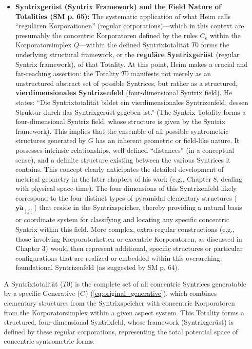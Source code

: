 \documentclass[12pt]{article}
\newcommand{\q}[1]{\enquote{#1}}
\newcommand{\elementarstruktur}{\bm{y\widetilde{a}}_{(j)}}
\newcommand{\syntrixtotalitaet}{T0}
\newcommand{\generative}{G}
\begin{document}
\begin{itemize}
    \item \textbf{Syntrixgerüst (Syntrix Framework) and the Field Nature of Totalities (SM p. 65):}
    The systematic application of what Heim calls \q{regulären Korporationen} (regular corporations)—which in this context are presumably the concentric Korporatoren defined by the rules \(C_k\) within the Korporatorsimplex \( Q \)—within the defined Syntrixtotalität \( \syntrixtotalitaet \) forms the underlying structural framework, or the \textbf{reguläre Syntrixgerüst} (regular Syntrix framework), of that Totality. At this point, Heim makes a crucial and far-reaching assertion: the Totality \( \syntrixtotalitaet \) manifests not merely as an unstructured abstract set of possible Syntrices, but rather as a structured, \textbf{vierdimensionales Syntrizenfeld} (four-dimensional Syntrix field). He states: \q{Die Syntrixtotalität bildet ein vierdimensionales Syntrizenfeld, dessen Struktur durch das Syntrixgerüst gegeben ist.} (The Syntrix Totality forms a four-dimensional Syntrix field, whose structure is given by the Syntrix framework). This implies that the ensemble of all possible syntrometric structures generated by \( \generative \) has an inherent geometric or field-like nature. It possesses intrinsic relationships, well-defined \q{distances} (in a conceptual sense), and a definite structure existing between the various Syntrices it contains. This concept clearly anticipates the detailed development of metrical geometry in the later chapters of his work (e.g., Chapter 8, dealing with physical space-time). The four dimensions of this Syntrizenfeld likely correspond to the four distinct types of pyramidal elementary structures (\( \elementarstruktur \)) that reside in the Syntrixspeicher, thereby providing a natural basis or coordinate system for classifying and locating any specific concentric Syntrix within this field. More complex, extra-regular constructions (e.g., those involving Korporatorketten or excentric Korporatoren, as discussed in Chapter 3) would then represent additional, specific structures or particular configurations that are realized or embedded within this overarching, foundational Syntrizenfeld (as suggested by SM p. 64).
\end{itemize}

A Syntrixtotalität (\(\syntrixtotalitaet\)) is the complete set of all concentric Syntrices generatable by a specific Generative (\(\generative\)) (\eqref{eq:original_generative}), which combines elementary structures from the Syntrixspeicher with concentric Korporatoren from the Korporatorsimplex within a given aspect system. This Totality forms a structured, four-dimensional Syntrixfeld, whose framework (Syntrixgerüst) is defined by these regular corporations, representing the total potential space of concentric syntrometric forms.
\end{document}
